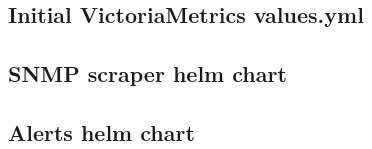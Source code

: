 \appendix
\chapter*{\fuggelek}
\setcounter{chapter}{\appendixnumber}

\section{Initial VictoriaMetrics values.yml}

\label{vmValues}



\newpage

\section{SNMP scraper helm chart}

\label{snmpScraperChart}



\newpage

\section{Alerts helm chart}

\label{kszkAlertsChart}


